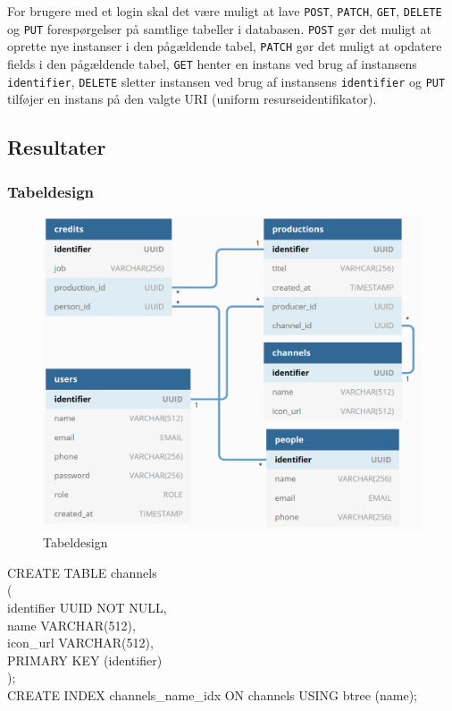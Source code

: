 \noindent
For brugere med et login skal det være muligt at lave \texttt{POST}, \texttt{PATCH}, \texttt{GET}, \texttt{DELETE} og \texttt{PUT} forespørgelser på samtlige tabeller i databasen. \texttt{POST} gør det muligt at oprette nye instanser i den pågældende tabel, \texttt{PATCH} gør det muligt at opdatere fields i den pågældende tabel, \texttt{GET} henter en instans ved brug af instansens \texttt{identifier}, \texttt{DELETE} sletter instansen ved brug af instansens \texttt{identifier} og \texttt{PUT} tilføjer en instans på den valgte URI (uniform resurseidentifikator).

\subsection{Resultater}
\subsubsection{Tabeldesign}
\begin{figure}[ht]
    \centering
    \includegraphics[scale=0.5]{figures/database_design.pdf}  
    \caption{Tabeldesign}
    \label{fig:tabledesign}
\end{figure}{}


\noindent
CREATE TABLE channels\\
(\\
    identifier UUID NOT NULL,\\
    name       VARCHAR(512),\\
    icon\_url  VARCHAR(512),\\
    PRIMARY KEY (identifier)\\
);\\
CREATE INDEX channels\_name\_idx ON channels USING btree (name);\\


